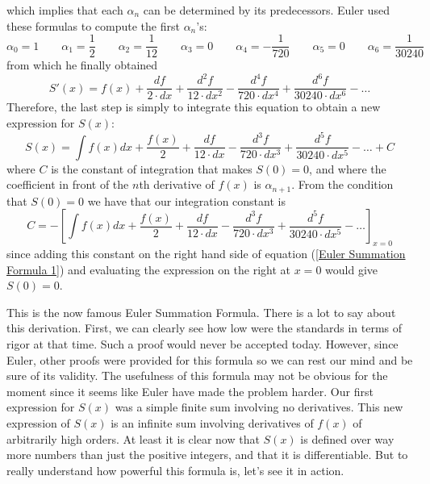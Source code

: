 which implies that each $\alpha_n$ can be determined by its predecessors. Euler used these formulas to compute the first $\alpha_n$'s:
$$\alpha_0 = 1 \qquad \alpha_1 = \frac{1}{2} \qquad \alpha_2 = \frac{1}{12} \qquad \alpha_3 = 0 \qquad \alpha_4 = - \frac{1}{720} \qquad \alpha_5 = 0 \qquad \alpha_6 = \frac{1}{30240}$$
from which he finally obtained
\begin{equation}
    S'(x) = f(x) + \frac{df}{2\cdot dx} + \frac{d^2f}{12\cdot dx^2} - \frac{d^4f}{720\cdot dx^4} + \frac{d^6f}{30240\cdot dx^6} - \dots
\end{equation}
Therefore, the last step is simply to integrate this equation to obtain a new expression for $S(x)$:
\begin{equation}\label{Euler Summation Formula 1}
    \boxed{S(x) = \int f(x)dx + \frac{f(x)}{2} + \frac{df}{12\cdot dx} - \frac{d^3f}{720\cdot dx^3} + \frac{d^5f}{30240\cdot dx^5} - \dots + C}
\end{equation}
where $C$ is the constant of integration that makes $S(0) = 0$, and where the coefficient in front of the $n$th derivative of $f(x)$ is $\alpha_{n+1}$. From the condition that $S(0) = 0$ we have that our integration constant is
\begin{equation}
    C = -\left[\int f(x)dx + \frac{f(x)}{2} + \frac{df}{12\cdot dx} - \frac{d^3f}{720\cdot dx^3} + \frac{d^5f}{30240\cdot dx^5} - \dots\right]_{x = 0}
\end{equation}
since adding this constant on the right hand side of equation (\ref{Euler Summation Formula 1}) and evaluating the expression on the right at $x = 0$ would give $S(0) = 0$. 

This is the now famous Euler Summation Formula. There is a lot to say about this derivation. First, we can clearly see how low were the standards in terms of rigor at that time. Such a proof would never be accepted today. However, since Euler, other proofs were provided for this formula so we can rest our mind and be sure of its validity. The usefulness of this formula may not be obvious for the moment since it seems like Euler have made the problem harder. Our first expression for $S(x)$ was a simple finite sum involving no derivatives. This new expression of $S(x)$ is an infinite sum involving derivatives of $f(x)$ of arbitrarily high orders. At least it is clear now that $S(x)$ is defined over way more numbers than just the positive integers, and that it is differentiable. But to really understand how powerful this formula is, let's see it in action.

